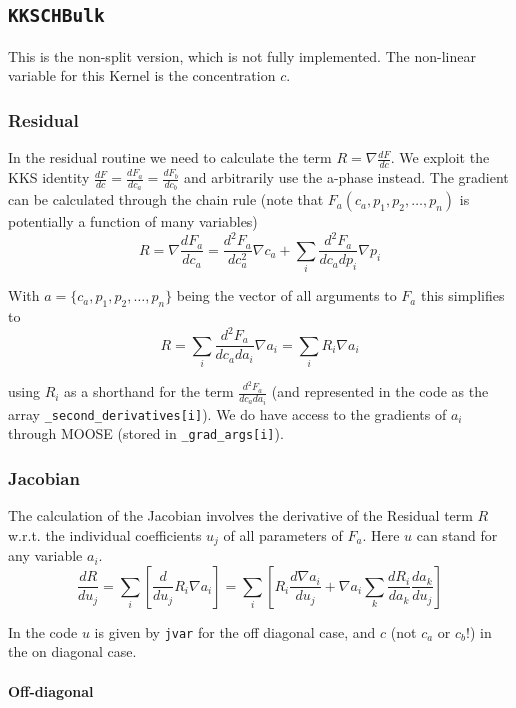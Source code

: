 \documentclass[]{article}
\begin{document}
\subsection{\texttt{KKSCHBulk}}
This is the non-split version, which is not fully implemented. The non-linear variable for this Kernel is the concentration $c$.


\subsubsection{Residual}

In the residual routine we need to calculate the term $R=\nabla \frac{dF}{dc}$. We exploit the KKS identity $\frac{dF}{dc}=\frac{dF_a}{dc_a}=\frac{dF_b}{dc_b}$ and arbitrarily use the a-phase instead.
The gradient can be calculated through the chain rule (note that $F_a(c_a, p_1,p_2,\dots,p_n)$ is potentially a function of many variables)
\[
R = \nabla \frac{dF_a}{dc_a} = \frac{d^2F_a}{dc_a^2}\nabla c_a + \sum_i \frac{d^2F_a}{dc_adp_i}\nabla p_i 
\] 

With $a = \{c_a, p_1,p_2,\dots,p_n\}$ being the vector of all arguments to $F_a$ this simplifies to 
\[
R=\sum_i \frac{d^2F_a}{dc_ada_i}\nabla a_i  = \sum_i R_i \nabla a_i
\]

using $R_i$ as a shorthand for the term $\frac{d^2F_a}{dc_ada_i}$ (and represented in the code as the array \texttt{\_second\_derivatives[i]}). We do have access to the gradients of $a_i$ through MOOSE (stored in \texttt{\_grad\_args[i]}).

\subsubsection{Jacobian}

The calculation of the Jacobian involves the derivative of the Residual term $R$ w.r.t. the individual coefficients $u_j$ of all parameters of $F_a$. Here $u$ can stand for 
any variable $a_i$.
\[
\frac{dR}{du_j} = \sum_i \left[ \frac d{du_j} R_i\nabla a_i \right] = \sum_i \left[  R_i\frac{d\nabla a_i}{du_j} + \nabla a_i \sum_k \frac {dR_i}{da_k}\frac{da_k}{du_j} \right] 
\]

In the code $u$ is given by \texttt{jvar} for the off diagonal case, and $c$ (not $c_a$ or $c_b$!) in the on diagonal case. 

\paragraph{Off-diagonal}
\end{document}
